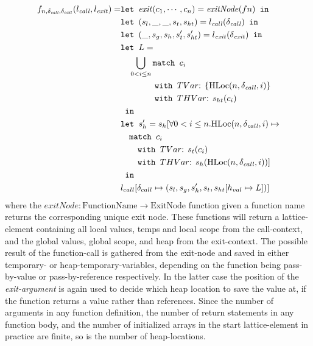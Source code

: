 \begin{align}
f_{n,\delta_{\mathit{call}}, \delta_{\mathit{exit}}}(l_{\mathit{call}}, l_{\mathit{exit}})=   &\texttt{let } \mathit{exit}(c_1, \cdots, c_n) = \mathit{exitNode}(fn) \texttt{ in }\notag\\
                                                &\texttt{let } (s_l, \_, \_, s_t, s_{ht}) = l_{\mathit{call}}(\delta_{\mathit{call}}) \texttt{ in }\notag\\
                                                &\texttt{let } (\_, s_g, s_h, s_t', s_{ht}') = l_{\mathit{exit}}(\delta_{\mathit{exit}}) \texttt{ in }\notag\\
                                                &\texttt{let } L = \notag\\
                                                &\quad \bigcup_{0<i \leq n} \texttt{match }c_i\notag\\
                                                &\quad\quad\quad\quad \texttt{with }TVar\text{: } \{\text{HLoc}(n,\delta_{\mathit{call}}, i)\}\notag\\
                                                &\quad\quad\quad\quad \texttt{with }THVar\text{: } s_{ht}(c_i)\notag\\
                                                & \texttt{ in }\notag\\
                                                &\texttt{let } s_h' = s_h[\forall 0 < i \leq n. \text{HLoc}(n,\delta_{\mathit{call}}, i) \mapsto\notag\\
                                                &\quad\texttt{match }c_i\notag\\
                                                &\quad\quad \texttt{with }TVar\text{: } s_t(c_i)\notag\\
                                                &\quad\quad \texttt{with }THVar\text{: } s_h(\text{HLoc}(n,\delta_{\mathit{call}}, i))]\notag\\
                                                & \texttt{ in }\notag\\
                                                &l_{call}[\delta_{call}\mapsto (s_l,s_g,s_h', s_t, s_{ht}[h_{val}\mapsto L])] \label{eq:result2}
\end{align}
where the $\mathit{exitNode} : \text{FunctionName} \rightarrow \text{ExitNode}$ function given a function name returns the corresponding unique exit node. These functions will return a lattice-element containing all local values, temps and local scope from the call-context, and the global values, global scope, and heap from the exit-context. The possible result of the function-call is gathered from the exit-node and saved in either temporary- or heap-temporary-variables, depending on the function being pass-by-value or pass-by-reference respectively. In the latter case the position of the \emph{exit-argument} is again used to decide which heap location to save the value at, if the function returns a value rather than references. Since the number of arguments in any function definition, the number of return statements in any function body, and the number of initialized arrays in the start lattice-element in practice are finite, so is the number of heap-locations. 

